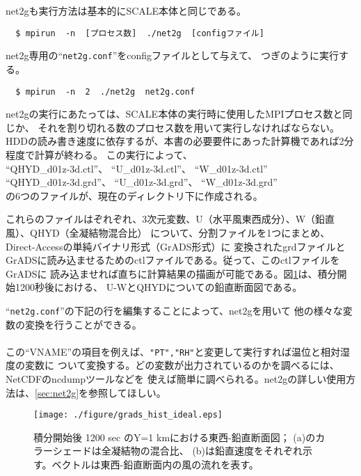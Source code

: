 net2gも実行方法は基本的にSCALE本体と同じである。
\begin{verbatim}
  $ mpirun  -n  [プロセス数]  ./net2g  [configファイル]
\end{verbatim}
net2g専用の``\verb|net2g.conf|''をconfigファイルとして与えて、
つぎのように実行する。
\begin{verbatim}
  $ mpirun  -n  2  ./net2g  net2g.conf
\end{verbatim}

\noindent net2gの実行にあたっては、SCALE本体の実行時に使用したMPIプロセス数と同じか、
それを割り切れる数のプロセス数を用いて実行しなければならない。
HDDの読み書き速度に依存するが、本書の必要要件にあった計算機であれば2分程度で計算が終わる。
この実行によって、\\
``QHYD\_d01z-3d.ctl''、 ``U\_d01z-3d.ctl''、 ``W\_d01z-3d.ctl''\\
``QHYD\_d01z-3d.grd''、 ``U\_d01z-3d.grd''、 ``W\_d01z-3d.grd''\\
の6つのファイルが、現在のディレクトリ下に作成される。

これらのファイルはぞれぞれ、3次元変数、U（水平風東西成分）、W（鉛直風）、QHYD（全凝結物混合比）
について、分割ファイルを1つにまとめ、Direct-Accessの単純バイナリ形式（GrADS形式）に
変換されたgrdファイルとGrADSに読み込ませるためのctlファイルである。従って、このctlファイルをGrADSに
読み込ませれば直ちに計算結果の描画が可能である。図\ref{fig_ideal}は、積分開始1200秒後における、
U-WとQHYDについての鉛直断面図である。


``\verb|net2g.conf|''の下記の行を編集することによって、net2gを用いて
他の様々な変数の変換を行うことができる。\\

{\small {\gt
{}}}\\

\noindent この``VNAME''の項目を例えば、\verb|"PT","RH"|と変更して実行すれば温位と相対湿度の変数に
ついて変換する。どの変数が出力されているのかを調べるには、NetCDFのncdumpツールなどを
使えば簡単に調べられる。net2gの詳しい使用方法は、\ref{sec:net2g}を参照してほしい。


\begin{figure}[t]
\begin{center}
  \texttt{[image: ./figure/grads\_hist\_ideal.eps]}\\
  \caption{積分開始後 1200 sec のY=1 kmにおける東西-鉛直断面図；
           (a)のカラーシェードは全凝結物の混合比、
           (b)は鉛直速度をそれぞれ示す。ベクトルは東西-鉛直断面内の風の流れを表す。}
  \label{fig_ideal}
\end{center}
\end{figure}

